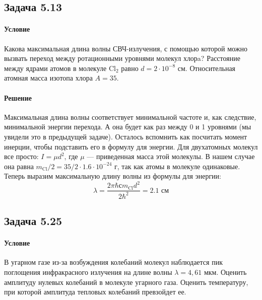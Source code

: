 \documentclass[12pt]{article}
\begin{document}
\subsection{Задача 5.13}
\label{task_5.13}
\paragraph{Условие} Какова максимальная длина волны СВЧ-излучения, с помощью которой можно вызвать переход между ротационными уровнями молекул хлорa? Расстояние между ядрами атомов в молекуле $\text{Cl}_2$ равно $d = 2 \cdot 10^{-8}$ см. Относительная атомная масса изотопа хлора $A=35$.
\paragraph{Решение}
Максимальная длина волны соответствует минимальной частоте и, как следствие, минимальной энергии перехода. А она будет как раз между 0 и 1 уровнями (мы увидели это в предыдущей задаче). Осталось вспомнить как посчитать момент инерции, чтобы подставить его в формулу для энергии. Для двухатомных молекул все просто: $I = \mu d^2$, где $\mu$ --- приведенная масса этой молекулы. В нашем случае она равна $m_{\text{Cl}}/2 = 35/2 \cdot 1.6 \cdot 10^{-24}$ г, так как атомы в молекуле одинаковые. Теперь выразим максимальную длину волны из формулы для энергии:
\begin{equation*}
    \lambda = \dfrac{2\pi \hbar с m_{\text{Cl}} d^2}{2\hbar^2} = 2.1 \text{ см}
\end{equation*}


\subsection{Задача 5.25}
\label{task_5.25}
\paragraph{Условие} В угарном газе из-за возбуждения колебаний молекул наблюдается  пик поглощения инфракрасного излучения на длине волны $\lambda = 4,61$ мкм. Оценить амплитуду нулевых колебаний в молекуле угарного газа. Оценить температуру, при которой амплитуда тепловых колебаний превзойдет ее.
\end{document}
